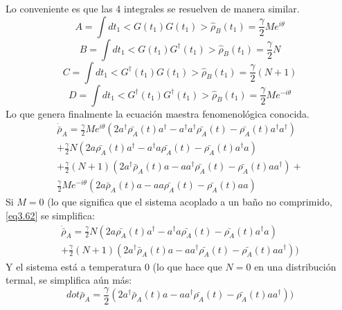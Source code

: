 \documentclass{book}
\begin{document}
 Lo conveniente es que las 4 integrales se resuelven de manera similar.
\begin{equation}\label{eq3.58}{ A= \int dt_1 <G(t_1)G(t_1)>\hat{\rho}_B(t_1) =\frac{\gamma}{2}Me^{i\theta}}\end{equation}
\begin{equation}\label{eq3.59}{ B= \int dt_1 <G(t_1)G^\dag(t_1)>\hat{\rho}_B(t_1) = \frac{\gamma}{2}}N\end{equation}
\begin{equation}\label{eq3.60}{ C= \int dt_1   <G^\dag(t_1)G(t_1)>\hat{\rho}_B(t_1) =\frac{\gamma}{2}}(N+1)\end{equation}
\begin{equation}\label{eq3.61}{ D= \int dt_1 <G^\dag(t_1)G^\dag(t_1)>\hat{\rho}_B(t_1) =\frac{\gamma}{2} Me^{-i\theta} }\end{equation}
Lo que genera finalmente la ecuación maestra fenomenológica conocida.
 \begin{equation}\label{eq3.62}\begin{aligned}\dot{\bar{\rho}}_A=\frac{\gamma}{2}Me^{i\theta}(2a^\dag \bar{\rho_A}(t)a^\dag-a^\dag a^\dag\bar{\rho_A}(t)-\bar{\rho_A}(t)a^\dag a^\dag)\\ +\frac{\gamma}{2}N(2a\bar{\rho_A}(t)a^\dag-a^\dag a\bar{\rho_A}(t)-\bar{\rho_A}(t)a^\dag a) \\ +\frac{\gamma}{2}(N+1)(2a^\dag \bar{\rho}_A(t)a-aa^\dag\bar{\rho_A}(t)-\bar{\rho_A}(t)a a^\dag)+\\ \frac{\gamma}{2} Me^{-i\theta} (2a \bar{\rho}_A(t)a-a a\bar{\rho_A}(t)-\bar{\rho_A}(t)a a)\end{aligned}\end{equation}
 Si $M=0$ (lo que significa que el sistema acoplado a un baño no comprimido, \ref{eq3.62} se simplifica:
  \begin{equation}\label{eq3.63}\begin{aligned}\dot{\bar{\rho}}_A=\frac{\gamma}{2}N(2a\bar{\rho_A}(t)a^\dag-a^\dag a\bar{\rho_A}(t)-\bar{\rho_A}(t)a^\dag a) \\ +\frac{\gamma}{2}(N+1)(2a^\dag \bar{\rho}_A(t)a-aa^\dag\bar{\rho_A}(t)-\bar{\rho_A}(t)a a^\dag))\end{aligned}\end{equation}
  Y el sistema está a temperatura 0 (lo que hace que $N=0$ en una distribución termal, se simplifica aún más:
   \begin{equation}\label{eq3.64}dot{\bar{\rho}}_A=\frac{\gamma}{2}(2a^\dag \bar{\rho}_A(t)a-aa^\dag\bar{\rho_A}(t)-\bar{\rho_A}(t)a a^\dag))\end{equation}
\end{document}
